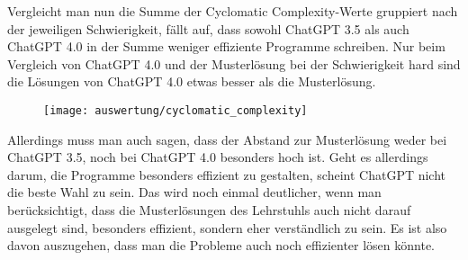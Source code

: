 \documentclass[class=scrbook, crop=false]{standalone}
\begin{document}
    Vergleicht man nun die Summe der Cyclomatic Complexity-Werte gruppiert nach der jeweiligen Schwierigkeit, fällt auf,
    dass sowohl ChatGPT 3.5 als auch ChatGPT 4.0 in der Summe weniger effiziente Programme schreiben.
    Nur beim Vergleich von ChatGPT 4.0 und der Musterlösung bei der Schwierigkeit hard sind die Lösungen von ChatGPT 4.0
    etwas besser als die Musterlösung.
    \begin{figure}[H]
        \centering
        \texttt{[image: auswertung/cyclomatic\_complexity]}
        \caption{}
        \label{fig:4}
    \end{figure}
    Allerdings muss man auch sagen, dass der Abstand zur Musterlösung weder bei ChatGPT 3.5, noch bei ChatGPT 4.0 besonders
    hoch ist.
    Geht es allerdings darum, die Programme besonders effizient zu gestalten, scheint ChatGPT nicht die beste Wahl zu sein.
    Das wird noch einmal deutlicher, wenn man berücksichtigt, dass die Musterlösungen des Lehrstuhls auch nicht darauf ausgelegt
    sind, besonders effizient, sondern eher verständlich zu sein.
    Es ist also davon auszugehen, dass man die Probleme auch noch effizienter lösen könnte.

\ifstandalone
    \printglossary
    \printbibliography[heading=bibintoc]
\fi
\end{document}
